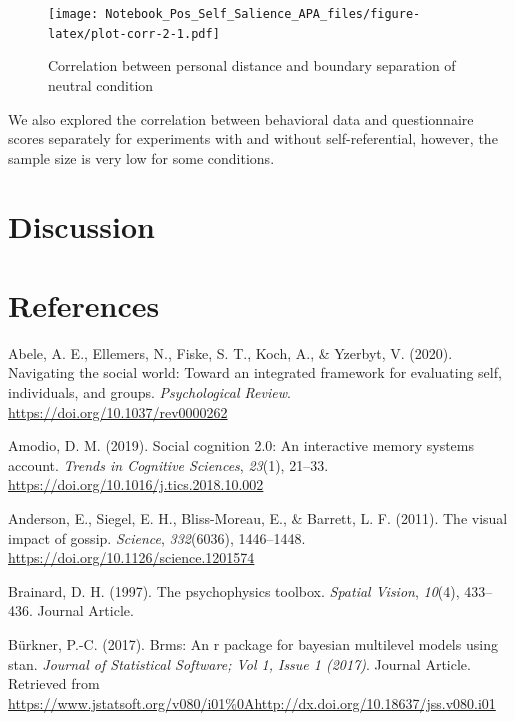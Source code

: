\documentclass[
  english,
  man]{apa6}
\begin{document}
\begin{figure}
\centering
\texttt{[image: Notebook\_Pos\_Self\_Salience\_APA\_files/figure-latex/plot-corr-2-1.pdf]}
\caption{\label{fig:plot-corr-2}Correlation between personal distance and boundary separation of neutral condition}
\end{figure}

We also explored the correlation between behavioral data and questionnaire scores separately for experiments with and without self-referential, however, the sample size is very low for some conditions.

\hypertarget{discussion-2}{%
\section{Discussion}\label{discussion-2}}

\hypertarget{references}{%
\section{References}\label{references}}

\begingroup
\setlength{\parindent}{-0.5in}
\setlength{\leftskip}{0.5in}

\hypertarget{refs}{}
\leavevmode\hypertarget{ref-abele_navigating_2020}{}%
Abele, A. E., Ellemers, N., Fiske, S. T., Koch, A., \& Yzerbyt, V. (2020). Navigating the social world: Toward an integrated framework for evaluating self, individuals, and groups. \emph{Psychological Review}. \url{https://doi.org/10.1037/rev0000262}

\leavevmode\hypertarget{ref-amodio_social_2019}{}%
Amodio, D. M. (2019). Social cognition 2.0: An interactive memory systems account. \emph{Trends in Cognitive Sciences}, \emph{23}(1), 21--33. \url{https://doi.org/10.1016/j.tics.2018.10.002}

\leavevmode\hypertarget{ref-anderson_visual_2011}{}%
Anderson, E., Siegel, E. H., Bliss-Moreau, E., \& Barrett, L. F. (2011). The visual impact of gossip. \emph{Science}, \emph{332}(6036), 1446--1448. \url{https://doi.org/10.1126/science.1201574}

\leavevmode\hypertarget{ref-Brainard_1997}{}%
Brainard, D. H. (1997). The psychophysics toolbox. \emph{Spatial Vision}, \emph{10}(4), 433--436. Journal Article.

\leavevmode\hypertarget{ref-Buxfcrkner_2017}{}%
Bürkner, P.-C. (2017). Brms: An r package for bayesian multilevel models using stan. \emph{Journal of Statistical Software; Vol 1, Issue 1 (2017)}. Journal Article. Retrieved from \url{https://www.jstatsoft.org/v080/i01\%0Ahttp://dx.doi.org/10.18637/jss.v080.i01}
\end{document}
